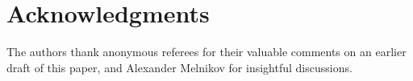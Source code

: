 \documentclass[a4paper,UKenglish,autoref,thm-restate,numberwithinsect]{lipics-v2021}
\begin{document}

\section*{Acknowledgments}
The authors thank anonymous referees for their valuable comments on an
earlier draft of this paper, and Alexander Melnikov for insightful
discussions. 





\end{document}
